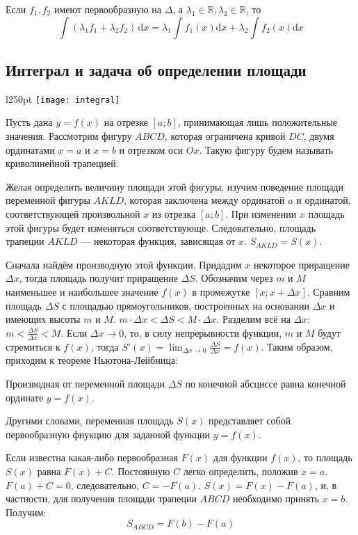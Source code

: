 \begin{Consequence}[линейность]
	Если $f_1,f_2$ имеют первообразную на $\Delta$, а $\lambda_1\in\mathbb{R},
	\lambda_2\in\mathbb{R}$, то 
	$$\int(\lambda_1f_1+\lambda_2f_2)\,\mathrm{d}x=\lambda_1\int f_1(x)\mathrm{d}x
	+\lambda_2\int f_2(x)\mathrm{d}x$$
\end{Consequence}
\subsection*{Интеграл и задача об определении площади}
\begin{wrapfigure}{l}{250pt}
	\texttt{[image: integral]}
\end{wrapfigure}
Пусть дана $y=f(x)$ на отрезке $[a;b]$, принимающая лишь положительные значения.
Рассмотрим фигуру $ABCD$, которая ограничена кривой $DC$, двумя ординатами $x=a$
и $x=b$ и отрезком оси $Ox$. Такую фигуру будем называть криволинейной трапецией.

Желая определить величину площади этой фигуры, изучим поведение площади переменной
фигуры $AKLD$, которая заключена между ординатой $a$ и ординатой, соответствующей
произвольной $x$ из отрезка $[a;b]$. При изменении $x$ площадь этой фигуры будет 
изменяться соответствующе. Следовательно, площадь трапеции $AKLD$ --- некоторая
функция, зависящая от $x$. $S_{AKLD}=S(x)$.

Сначала найдём производную этой функции.
Придадим $x$ некоторое приращение $\Delta x$, тогда площадь получит приращение $\Delta S$.
Обозначим через $m$ и $M$ наименьшее и наибольшее значение $f(x)$ в промежутке 
$[x; x+\Delta x]$. Сравним площадь $\Delta S$ с площадью прямоугольников,
построенных на основании $\Delta x$ и имеющих высоты $m$ и $M$. 
$m\cdot\Delta x < \Delta S < M\cdot\Delta x$. Разделим всё на $\Delta x$:
$m<\frac{\Delta S}{\Delta x}<M$. Если $\Delta x\to 0$, то, в силу непрерывности
функции, $m$ и $M$ будут стремиться к $f(x)$, тогда 
$S'(x) = \lim_{\Delta x\to 0}\frac{\Delta S}{\Delta x} = f(x)$.
Таким образом, приходим к  теореме Ньютона-Лейбница:
\begin{Theorem}
	Производная от переменной площади $\Delta S$ по конечной абсциссе равна конечной
	ординате $y=f(x)$.
\end{Theorem}
Другими словами, переменная площадь $S(x)$ представляет собой первообразную
фнукцию для заданной функции $y=f(x)$. 

Если известна какая-либо первообразная $F(x)$ для функции $f(x)$, то площадь
$S(x)$ равна $F(x)+C$. Постоянную $C$ легко определить, положив $x=a$. 
$F(a)+C=0$, следовательно, $C = -F(a)$.  $S(x)=F(x)-F(a)$, и, в частности,
для получения площади трапеции $ABCD$ необходимо принять $x=b$. Получим:
$$S_{ABCD}=F(b)-F(a)$$

